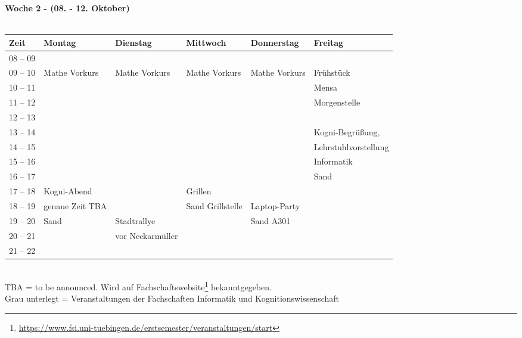 \textbf{Woche 2 - (08. - 12. Oktober)}\\
\\
\begin{tabular}{|l|p{}|p{}|p{}|p{}|p{}|} \hline
 Zeit & Montag & Dienstag & Mittwoch & Donnerstag & Freitag \\ \hline \hline
 08 -- 09 & & & & & \\ \hline
 09 -- 10 & \footnotesize{Mathe Vorkurs} & \footnotesize{Mathe Vorkurs} & \footnotesize{Mathe Vorkurs} & \footnotesize{Mathe Vorkurs} & \cellcolor{lightlightgray}\footnotesize{Frühstück} \\ \cline{1-1}
 10 -- 11 & & & & & \cellcolor{lightlightgray} \scriptsize{Mensa}\\ \cline{1-1}
 11 -- 12 & & & & & \cellcolor{lightlightgray} \scriptsize{Morgenstelle} \\ \cline{1-1}\cline{6-6}
 12 -- 13 & & & & & \\ \cline{1-1}\cline{6-6}
 13 -- 14 & & & & & \cellcolor{lightlightgray} \scriptsize{Kogni-Begrüßung,} \\ \cline{1-1}
 14 -- 15 & & & & & \cellcolor{lightlightgray} \scriptsize{Lehrstuhlvorstellung} \\ \cline{1-1}
 15 -- 16 & & & & & \cellcolor{lightlightgray} \scriptsize{Informatik} \\ \cline{1-5}
 16 -- 17 & & & & & \cellcolor{lightlightgray} \scriptsize{Sand}\\ \cline{1-2}\cline{4-4} \cline{6-6}
 17 -- 18 & \cellcolor{lightlightgray} \footnotesize{Kogni-Abend} & & \cellcolor{lightlightgray} \footnotesize{Grillen} & & \\ \cline{1-1} \cline{5-5}
 18 -- 19 & \cellcolor{lightlightgray} \scriptsize{genaue Zeit TBA} & & \cellcolor{lightlightgray} \scriptsize{Sand Grillstelle} & \cellcolor{lightlightgray} \footnotesize{Laptop-Party}& \\ \cline{1-1} \cline{3-3}
 19 -- 20 & \cellcolor{lightlightgray} \scriptsize{Sand} & \cellcolor{lightlightgray} \footnotesize{Stadtrallye} & \cellcolor{lightlightgray} & \cellcolor{lightlightgray} \scriptsize{Sand A301} & \\ \cline{1-1}
 20 -- 21 & \cellcolor{lightlightgray} & \cellcolor{lightlightgray} \scriptsize{vor Neckarmüller} & \cellcolor{lightlightgray} & \cellcolor{lightlightgray} & \\ \cline{1-1}
 21 -- 22 & \cellcolor{lightlightgray} & \cellcolor{lightlightgray} & \cellcolor{lightlightgray} & \cellcolor{lightlightgray} & \\ \hline
\end{tabular}
\\
\scriptsize{TBA = to be announced. Wird auf Fachschaftswebsite\footnote{\url{https://www.fsi.uni-tuebingen.de/erstsemester/veranstaltungen/start}}  bekanntgegeben.} \\
\scriptsize{Grau unterlegt = Veranstaltungen der Fachschaften Informatik und Kognitionswissenschaft }
\newpage


